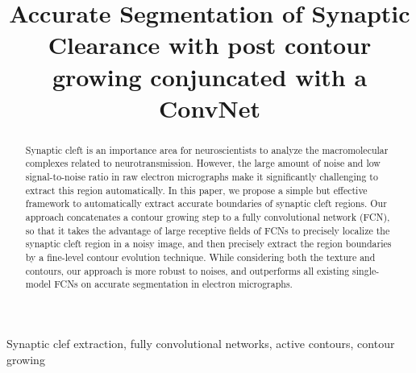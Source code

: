 \documentclass{article}
\newcommand{\comments}[1]{}
\begin{document}
\sloppy

\def\x{{\mathbf x}}
\def\L{{\cal L}}


\title{Accurate Segmentation of Synaptic Clearance with post contour growing conjuncated with a ConvNet}
%
\address{}


\maketitle


%
\begin{abstract}

Synaptic cleft is an importance area for neuroscientists to analyze the macromolecular complexes related to neurotransmission.
However, the large amount of noise and low signal-to-noise ratio in raw electron micrographs make it significantly challenging to extract this region automatically.
%
In this paper, we propose a simple but effective framework to automatically extract accurate boundaries of synaptic cleft regions. 
Our approach concatenates a contour growing step to a fully convolutional network (FCN), so that it takes the advantage of large receptive fields of FCNs to precisely localize the synaptic cleft region in a noisy image, and then precisely extract the region boundaries by a fine-level contour evolution technique. 
%
While considering both the texture and contours, our approach is more robust to noises, and outperforms all existing single-model FCNs on accurate segmentation in electron micrographs.

\comments{
In this paper, we proposed a novel contour extraction algorithm combined with a fully convolutional network to localize the accurate synaptic cleft region in such highly noisy images.
%
Starting with an initial segmentation form a fully convolutional network, our contour extraction algorithm first finds out an initial piece of contour from the pre-segmentation, and then grows it to localize the whole synaptic cleft region.
Different from previous region-based techniques or dense prediction networks, our model focuses on localizing the exact contours rather than the internal texture, which is more robust to noises in electron micrographs.
Experiments demonstrate the effectiveness and superiority of our proposed method on segmenting the target regions in electron micrographs.
}
\end{abstract}
%
\begin{keywords}
Synaptic clef extraction, fully convolutional networks, active contours, contour growing
\end{keywords}
%




\end{document}
